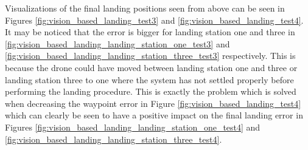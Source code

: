 \documentclass[../Head/report.tex]{subfiles}
\begin{document}
Visualizations of the final landing positions seen from above can be seen in Figures \ref{fig:vision_based_landing_test3} and \ref{fig:vision_based_landing_test4}. It may be noticed that the error is bigger for landing station one and three in \ref{fig:vision_based_landing_landing_station_one_test3} and \ref{fig:vision_based_landing_landing_station_three_test3} respectively. This is because the drone could have moved between landing station one and three or landing station three to one where the system has not settled properly before performing the landing procedure. This is exactly the problem which is solved when decreasing the waypoint error in Figure \ref{fig:vision_based_landing_test4} which can clearly be seen to have a positive impact on the final landing error in Figures \ref{fig:vision_based_landing_landing_station_one_test4} and \ref{fig:vision_based_landing_landing_station_three_test4}.  
\end{document}
